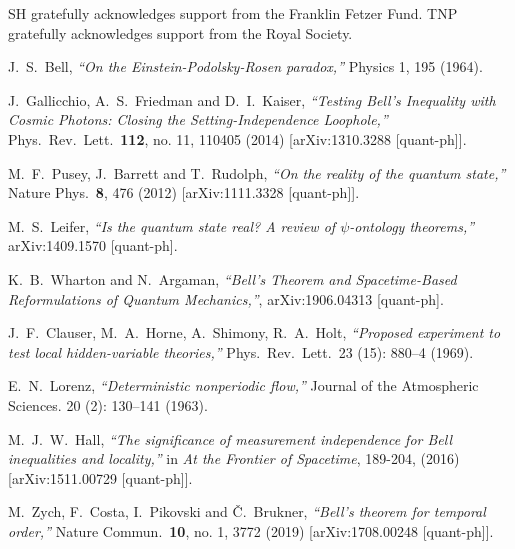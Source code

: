 \documentclass[12pt]{article}
\begin{document}
SH gratefully acknowledges support from the Franklin Fetzer Fund. TNP gratefully acknowledges support from the Royal Society. 

\begin{thebibliography}{99}
\small{


 J.~S.~Bell, {\sl ``On the Einstein-Podolsky-Rosen paradox,''} Physics 1, 195 (1964).

  J.~Gallicchio, A.~S.~Friedman and D.~I.~Kaiser,
  {\sl ``Testing Bell’s Inequality with Cosmic Photons: Closing the Setting-Independence Loophole,''}
  Phys.\ Rev.\ Lett.\  {\bf 112}, no. 11, 110405 (2014)
  [arXiv:1310.3288 [quant-ph]].
  
  
  M.~F.~Pusey, J.~Barrett and T.~Rudolph,
  {\sl ``On the reality of the quantum state,''}
  Nature Phys.\  {\bf 8}, 476 (2012)
  [arXiv:1111.3328 [quant-ph]].
  
  M.~S.~Leifer,
  {\sl ``Is the quantum state real? A review of $\psi$-ontology theorems,''}
  arXiv:1409.1570 [quant-ph].
 
  K.~B.~Wharton and N.~Argaman, {\sl ``Bell's Theorem and Spacetime-Based Reformulations of Quantum Mechanics,''}, arXiv:1906.04313 [quant-ph].


  J.~F.~Clauser, M.~A.~Horne, A.~Shimony, R.~A.~Holt, {\sl ``Proposed experiment to test local hidden-variable theories,''} Phys.\ Rev.\ Lett.\ 23 (15): 880--4 (1969).
 
  E.~N.~Lorenz,  {\sl ``Deterministic nonperiodic flow,''} Journal of the Atmospheric Sciences. 20 (2): 130–141 (1963).

  
   M.~J.~W.~Hall, {\sl ``The significance of measurement independence for Bell inequalities and locality,''} in {\sl At the Frontier of Spacetime},  189-204, (2016) [arXiv:1511.00729 [quant-ph]].

  M.~Zych, F.~Costa, I.~Pikovski and Č.~Brukner,
  {\sl ``Bell’s theorem for temporal order,''}
  Nature Commun.\  {\bf 10}, no. 1, 3772 (2019)
  [arXiv:1708.00248 [quant-ph]].

}
\end{thebibliography}
\end{document}
